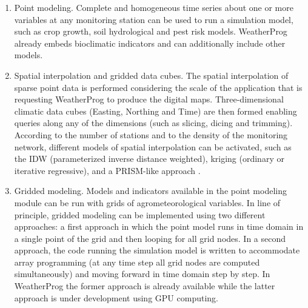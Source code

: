 \documentclass[authoryear,preprint,review,12pt]{elsarticle}
\begin{document}
\begin{enumerate}
    \item Point modeling. Complete and homogeneous time series about one or more variables at any monitoring station can be used to run a simulation model, such as crop growth, soil hydrological and pest risk models.
    WeatherProg already embeds bioclimatic indicators and can additionally include other models.
    
    \item Spatial interpolation and gridded data cubes. The spatial interpolation of sparse point data is performed considering the scale of the application that is requesting WeatherProg to produce the digital maps.
    Three-dimensional climatic data cubes (Easting, Northing and Time) are then formed enabling queries along any of the dimensions (such as slicing, dicing and trimming).
    According to the number of stations and to the density of the monitoring network, different models of spatial interpolation can be activated, such as the IDW (parameterized inverse distance weighted), kriging (ordinary or iterative regressive), and a PRISM-like approach \citep{Daly08_PRISM_USA}.
    \item Gridded modeling. Models and indicators available in the point modeling module can be run with grids of agrometeorological variables.
    In line of principle, gridded modeling can be implemented using two different approaches: a first approach in which the point model runs in time domain in a single point of the grid and then looping for all grid nodes.
    In a second approach, the code running the simulation model is written to accommodate array programming (at any time step all grid nodes are computed simultaneously) and moving forward in time domain step by step.
    In WeatherProg the former approach is already available while the latter approach is under development using GPU computing.
    
\end{enumerate}
\end{document}
